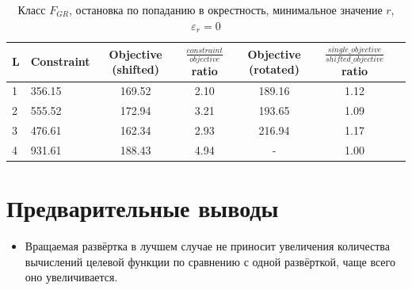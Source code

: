 \documentclass[a4paper]{article}
\begin{document}
\begin{table}[H]
\begin{center}
\caption{Класс $F_{GR}$, остановка по попаданию в окрестность, минимальное значение $r$, $\varepsilon_r=0$}
  \begin{tabular}{l|l*{5}{c}}
    \label{table:exp4}
  L & Constraint & Objective (shifted) & $\frac{constraint}{objective}$ ratio & Objective (rotated) & $\frac{single\_objective}{shifted\_objective}$ ratio \\
  \hline
  1 & 356.15 & 169.52 & 2.10 & 189.16 & 1.12 \\
  2 & 555.52 & 172.94 & 3.21 & 193.65 & 1.09 \\
  3 & 476.61 & 162.34 & 2.93 & 216.94 & 1.17 \\
  4 & 931.61 & 188.43 & 4.94 &  -     & 1.00 \\
  \end{tabular}
\end{center}
\end{table}

\section{Предварительные выводы}
\begin{itemize}
  \item Вращаемая развёртка в лучшем случае не приносит увеличения количества вычислений целевой функции по сравнению с одной развёрткой, чаще всего оно увеличивается.
\end{itemize}
\end{document}
